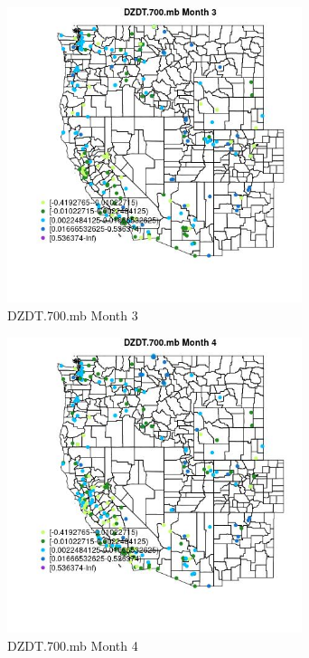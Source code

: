 \begin{figure} 
\centering  
\includegraphics[width=0.77\textwidth]{Code_Outputs/Report_ML_input_PM25_Step4_part_e_de_duplicated_aveswNAs_MapObsMo3DZDT700mb.jpg} 
\caption{\label{fig:Report_ML_input_PM25_Step4_part_e_de_duplicated_aveswNAsMapObsMo3DZDT700mb}DZDT.700.mb Month 3} 
\end{figure} 
 

\begin{figure} 
\centering  
\includegraphics[width=0.77\textwidth]{Code_Outputs/Report_ML_input_PM25_Step4_part_e_de_duplicated_aveswNAs_MapObsMo4DZDT700mb.jpg} 
\caption{\label{fig:Report_ML_input_PM25_Step4_part_e_de_duplicated_aveswNAsMapObsMo4DZDT700mb}DZDT.700.mb Month 4} 
\end{figure} 
 


